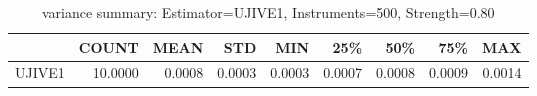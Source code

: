 \begin{table}[ht]
\centering
\caption{variance summary: Estimator=UJIVE1, Instruments=500, Strength=0.80}
\begin{tabular}{lrrrrrrrr}
\toprule
 & COUNT & MEAN & STD & MIN & 25\% & 50\% & 75\% & MAX \\
\midrule
UJIVE1 & 10.0000 & 0.0008 & 0.0003 & 0.0003 & 0.0007 & 0.0008 & 0.0009 & 0.0014 \\
\bottomrule
\end{tabular}
\end{table}
